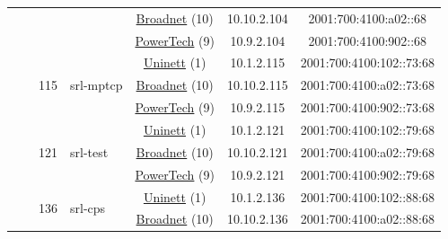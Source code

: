 \begin{small}
\begin{center}
\begin{longtable}{|c|c|c|c|c|c|c|c|}
  &  & \multicolumn{2}{|c|}{} & \multicolumn{2}{|c|}{\tiny{\href{https://www.broadnet.no}{Broadnet} (10)}} & \tiny{10.10.2.104} & \tiny{2001:700:4100:a02::68} \\* \cline{5-5}\cline{6-6}\cline{7-7}\cline{8-8}
  &  & \multicolumn{2}{|c|}{} & \multicolumn{2}{|c|}{\tiny{\href{http://www.powertech.no}{PowerTech} (9)}} & \tiny{10.9.2.104} & \tiny{2001:700:4100:902::68} \\* \cline{3-3}\cline{4-4}\cline{5-5}\cline{6-6}\cline{7-7}\cline{8-8}
  &  & \multirow{3}{*}{\tiny{115}} & \multicolumn{1}{|l|}{\multirow{3}{*}{\tiny{srl-mptcp}}} & \multicolumn{2}{|c|}{\tiny{\href{https://www.uninett.no}{Uninett} (1)}} & \tiny{10.1.2.115} & \tiny{2001:700:4100:102::73:68} \\* \cline{5-5}\cline{6-6}\cline{7-7}\cline{8-8}
  &  &  &  & \multicolumn{2}{|c|}{\tiny{\href{https://www.broadnet.no}{Broadnet} (10)}} & \tiny{10.10.2.115} & \tiny{2001:700:4100:a02::73:68} \\* \cline{5-5}\cline{6-6}\cline{7-7}\cline{8-8}
  &  &  &  & \multicolumn{2}{|c|}{\tiny{\href{http://www.powertech.no}{PowerTech} (9)}} & \tiny{10.9.2.115} & \tiny{2001:700:4100:902::73:68} \\* \cline{3-3}\cline{4-4}\cline{5-5}\cline{6-6}\cline{7-7}\cline{8-8}
  &  & \multirow{3}{*}{\tiny{121}} & \multicolumn{1}{|l|}{\multirow{3}{*}{\tiny{srl-test}}} & \multicolumn{2}{|c|}{\tiny{\href{https://www.uninett.no}{Uninett} (1)}} & \tiny{10.1.2.121} & \tiny{2001:700:4100:102::79:68} \\* \cline{5-5}\cline{6-6}\cline{7-7}\cline{8-8}
  &  &  &  & \multicolumn{2}{|c|}{\tiny{\href{https://www.broadnet.no}{Broadnet} (10)}} & \tiny{10.10.2.121} & \tiny{2001:700:4100:a02::79:68} \\* \cline{5-5}\cline{6-6}\cline{7-7}\cline{8-8}
  &  &  &  & \multicolumn{2}{|c|}{\tiny{\href{http://www.powertech.no}{PowerTech} (9)}} & \tiny{10.9.2.121} & \tiny{2001:700:4100:902::79:68} \\* \cline{3-3}\cline{4-4}\cline{5-5}\cline{6-6}\cline{7-7}\cline{8-8}
  &  & \multirow{3}{*}{\tiny{136}} & \multicolumn{1}{|l|}{\multirow{3}{*}{\tiny{srl-cps}}} & \multicolumn{2}{|c|}{\tiny{\href{https://www.uninett.no}{Uninett} (1)}} & \tiny{10.1.2.136} & \tiny{2001:700:4100:102::88:68} \\* \cline{5-5}\cline{6-6}\cline{7-7}\cline{8-8}
  &  &  &  & \multicolumn{2}{|c|}{\tiny{\href{https://www.broadnet.no}{Broadnet} (10)}} & \tiny{10.10.2.136} & \tiny{2001:700:4100:a02::88:68} \\* \cline{5-5}\cline{6-6}\cline{7-7}\cline{8-8}

\end{longtable}
\end{center}
\end{small}
